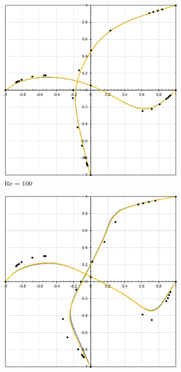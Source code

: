\begin{figure}[h!]
    \centering
    \caption{Cavidade tridimensional - Valores do campo de velocidade sobre as linhas médias.}
    \begin{subfigure}{0.49\textwidth}
        \centering
        \includegraphics[width=\linewidth]{Figuras/cavity3D/Re100.pdf}
        \caption{$\mathrm{Re}=100$}
    \end{subfigure}
    \begin{subfigure}{0.49\textwidth}
        \centering
        \includegraphics[width=\linewidth]{Figuras/cavity3D/Re400.pdf}

\end{subfigure}
\end{figure}
